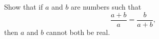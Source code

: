 Show that if $a$ and $b$ are numbers such that
\[\dfrac{a+b}{a}=\dfrac{b}{a+b},\]
then $a$ and $b$ cannot both be real.
